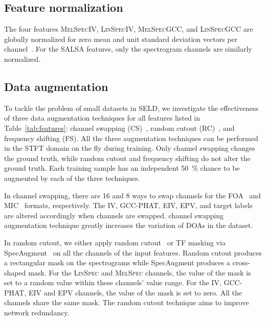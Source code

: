 \documentclass[journal]{IEEEtran}
\begin{document}
\subsection{Feature normalization}

The four features \textsc{MelSpecIV}, \textsc{LinSpecIV}, \textsc{MelSpecGCC}, and \textsc{LinSpecGCC} are globally normalized for zero mean and unit standard deviation vectors per channel~\cite{Adavanne2021DCASEInterference}. For the SALSA features, only the spectrogram channels are similarly normalized.

\subsection{Data augmentation}

To tackle the problem of small datasets in SELD, we investigate the effectiveness of three data augmentation techniques for all features listed in Table~\ref{tab:features}: channel swapping (CS)~\cite{Mazzon2019FirstEstimation, Wang2021ADetection}, random cutout (RC)~\cite{Zhong2020RandomAugmentation, Park2019SpecAugment:Recognition}, and frequency shifting (FS). All the three augmentation techniques can be performed in the STFT domain on the fly during training. Only channel swapping changes the ground truth, while random cutout and frequency shifting do not alter the ground truth. Each training sample has an independent \SI{50}{\percent} chance to be augmented by each of the three techniques.  

In channel swapping, there are \num{16} and \num{8} ways to swap channels for the FOA~\cite{Mazzon2019FirstEstimation} and MIC~\cite{Wang2021ADetection} formats, respectively. The IV, GCC-PHAT, EIV, EPV, and target labels are altered accordingly when channels are swapped. channel swapping augmentation technique greatly increases the variation of DOAs in the dataset. 

In random cutout, we either apply random cutout~\cite{Zhong2020RandomAugmentation} or TF masking via SpecAugment~\cite{Park2019SpecAugment:Recognition} on all the channels of the input features. Random cutout produces a rectangular mask on the spectrograms while SpecAugment produces a cross-shaped mask. For the \textsc{LinSpec} and \textsc{MelSpec} channels, the value of the mask is set to a random value within these channels' value range. For the IV, GCC-PHAT, EIV and EPV channels, the value of the mask is set to zero. All the channels share the same mask. The random cutout technique aims to improve network redundancy. 
\end{document}
